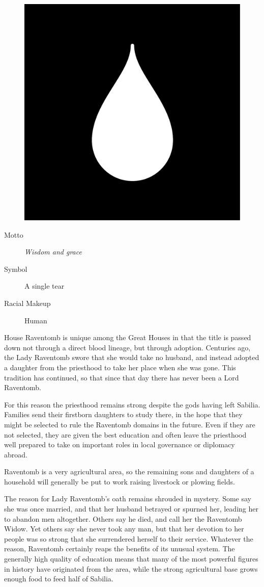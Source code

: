 \documentclass[10pt,twoside,openright,a4paper,twocolumn]{book}
\begin{document}
\begin{figure}
  \includegraphics[width=0.48\columnwidth]{images/HouseRaventomb}
\end{figure}

\begin{description}
\item[Motto] \textit{Wisdom and grace}

\item[Symbol] A single tear

\item[Racial Makeup] Human
\end{description}

\noindent
House Raventomb is unique among the Great Houses in that the title is passed
down not through a direct blood lineage, but through adoption.  Centuries ago,
the Lady Raventomb swore that she would take no husband, and instead adopted
a daughter from the priesthood to take her place when she was gone.  This
tradition has continued, so that since that day there has never been a Lord
Raventomb.

For this reason the priesthood remains strong despite the gods having left
Sabilia.  Families send their firstborn daughters to study there, in the hope
that they might be selected to rule the Raventomb domains in the future.  Even
if they are not selected, they are given the best education and often leave the
priesthood well prepared to take on important roles in local governance or
diplomacy abroad.

Raventomb is a very agricultural area, so the remaining sons and daughters of a
household will generally be put to work raising livestock or plowing fields.

The reason for Lady Raventomb's oath remains shrouded in mystery.  Some say she
was once married, and that her husband betrayed or spurned her, leading her to
abandon men altogether.  Others say he died, and call her the Raventomb Widow.
Yet others say she never took any man, but that her devotion to her people was
so strong that she surrendered herself to their service.  Whatever the reason,
Raventomb certainly reaps the benefits of its unusual system.  The generally
high quality of education means that many of the most powerful figures in
history have originated from the area, while the strong agricultural base grows
enough food to feed half of Sabilia.
\end{document}
